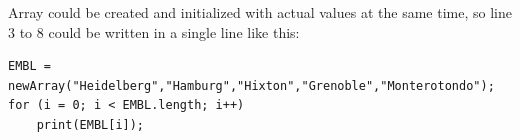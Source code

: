 Array could be created and initialized with actual values at the
same time, so line 3 to 8 could be written in a single line like this: 
\begin{lstlisting}[numbers=none]
EMBL = newArray("Heidelberg","Hamburg","Hixton","Grenoble","Monterotondo");
for (i = 0; i < EMBL.length; i++)
    print(EMBL[i]);
\end{lstlisting}
